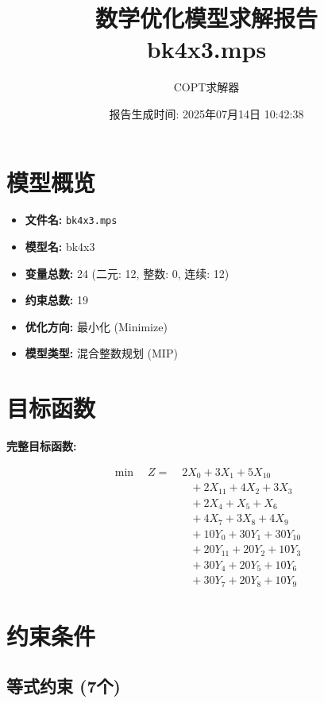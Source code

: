 \documentclass[a4paper,10pt]{article}
\title{数学优化模型求解报告\\{\large bk4x3.mps}}
\author{COPT求解器}
\date{报告生成时间: 2025年07月14日 10:42:38}
\begin{document}
\maketitle
\tableofcontents
\newpage

\section{模型概览}
\begin{itemize}
    \item \textbf{文件名:} \texttt{bk4x3.mps}
    \item \textbf{模型名:} bk4x3
    \item \textbf{变量总数:} 24 (二元: 12, 整数: 0, 连续: 12)
    \item \textbf{约束总数:} 19
    \item \textbf{优化方向:} 最小化 (Minimize)
    \item \textbf{模型类型:} 混合整数规划 (MIP)
\end{itemize}
\section{目标函数}

\textbf{完整目标函数:}

\allowdisplaybreaks
{\small
\begin{align}
\min \quad Z = &\; 2X_{0} + 3X_{1} + 5X_{10} \\[0.5ex]
&\quad  + 2X_{11} + 4X_{2} + 3X_{3} \\[0.5ex]
&\quad  + 2X_{4} + X_{5} + X_{6} \\[0.5ex]
&\quad  + 4X_{7} + 3X_{8} + 4X_{9} \\[0.5ex]
&\quad  + 10Y_{0} + 30Y_{1} + 30Y_{10} \\[0.5ex]
&\quad  + 20Y_{11} + 20Y_{2} + 10Y_{3} \\[0.5ex]
&\quad  + 30Y_{4} + 20Y_{5} + 10Y_{6} \\[0.5ex]
&\quad  + 30Y_{7} + 20Y_{8} + 10Y_{9}\nonumber
\end{align}
}

\section{约束条件}

\subsection{等式约束 (7个)}
\end{document}
